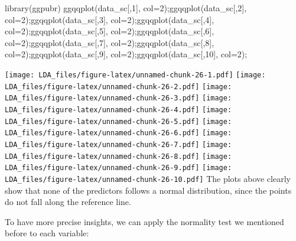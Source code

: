 \documentclass[
]{article}
\newenvironment{Shaded}{\begin{snugshade}}{\end{snugshade}}
\newcommand{\AttributeTok}[1]{\textcolor[rgb]{0.77,0.63,0.00}{#1}}
\newcommand{\DecValTok}[1]{\textcolor[rgb]{0.00,0.00,0.81}{#1}}
\newcommand{\FunctionTok}[1]{\textcolor[rgb]{0.00,0.00,0.00}{#1}}
\newcommand{\NormalTok}[1]{#1}
\begin{document}
\begin{Shaded}
\begin{Highlighting}[]
\FunctionTok{library}\NormalTok{(ggpubr)}
\FunctionTok{ggqqplot}\NormalTok{(data\_sc[,}\DecValTok{1}\NormalTok{], }\AttributeTok{col=}\DecValTok{2}\NormalTok{);}\FunctionTok{ggqqplot}\NormalTok{(data\_sc[,}\DecValTok{2}\NormalTok{], }\AttributeTok{col=}\DecValTok{2}\NormalTok{);}\FunctionTok{ggqqplot}\NormalTok{(data\_sc[,}\DecValTok{3}\NormalTok{], }\AttributeTok{col=}\DecValTok{2}\NormalTok{);}\FunctionTok{ggqqplot}\NormalTok{(data\_sc[,}\DecValTok{4}\NormalTok{], }\AttributeTok{col=}\DecValTok{2}\NormalTok{);}\FunctionTok{ggqqplot}\NormalTok{(data\_sc[,}\DecValTok{5}\NormalTok{], }\AttributeTok{col=}\DecValTok{2}\NormalTok{);}\FunctionTok{ggqqplot}\NormalTok{(data\_sc[,}\DecValTok{6}\NormalTok{], }\AttributeTok{col=}\DecValTok{2}\NormalTok{);}\FunctionTok{ggqqplot}\NormalTok{(data\_sc[,}\DecValTok{7}\NormalTok{], }\AttributeTok{col=}\DecValTok{2}\NormalTok{);}\FunctionTok{ggqqplot}\NormalTok{(data\_sc[,}\DecValTok{8}\NormalTok{], }\AttributeTok{col=}\DecValTok{2}\NormalTok{);}\FunctionTok{ggqqplot}\NormalTok{(data\_sc[,}\DecValTok{9}\NormalTok{], }\AttributeTok{col=}\DecValTok{2}\NormalTok{);}\FunctionTok{ggqqplot}\NormalTok{(data\_sc[,}\DecValTok{10}\NormalTok{], }\AttributeTok{col=}\DecValTok{2}\NormalTok{);}
\end{Highlighting}
\end{Shaded}

\texttt{[image: LDA\_files/figure-latex/unnamed-chunk-26-1.pdf]}
\texttt{[image: LDA\_files/figure-latex/unnamed-chunk-26-2.pdf]}
\texttt{[image: LDA\_files/figure-latex/unnamed-chunk-26-3.pdf]}
\texttt{[image: LDA\_files/figure-latex/unnamed-chunk-26-4.pdf]}
\texttt{[image: LDA\_files/figure-latex/unnamed-chunk-26-5.pdf]}
\texttt{[image: LDA\_files/figure-latex/unnamed-chunk-26-6.pdf]}
\texttt{[image: LDA\_files/figure-latex/unnamed-chunk-26-7.pdf]}
\texttt{[image: LDA\_files/figure-latex/unnamed-chunk-26-8.pdf]}
\texttt{[image: LDA\_files/figure-latex/unnamed-chunk-26-9.pdf]}
\texttt{[image: LDA\_files/figure-latex/unnamed-chunk-26-10.pdf]} The
plots above clearly show that none of the predictors follows a normal
distribution, since the points do not fall along the reference line.

To have more precise insights, we can apply the normality test we
mentioned before to each variable:
\end{document}
